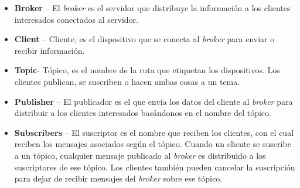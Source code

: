 \begin{itemize}
    \item \textbf{Broker} – El \textit{broker} es el servidor que distribuye la información a los clientes interesados conectados al servidor.
    \item \textbf{Client} – Cliente, es el dispositivo que se conecta al \textit{broker} para enviar o recibir información.
    \item \textbf{Topic}- T\'opico, es el nombre de la ruta que etiquetan los dispositivos. Los clientes publican, se suscriben o hacen ambas cosas a un tema.
    \item \textbf{Publisher} – El publicador es el que envía los datos del cliente  al \textit{broker} para distribuir a los clientes interesados bas\'andonos en el nombre del t\'opico.
    \item \textbf{Subscribers} – El suscriptor es el nombre que reciben los  clientes, con el cual reciben los mensajes asociados según el t\'opico. Cuando un cliente se suscribe a un t\'opico, cualquier mensaje publicado al \textit{broker} es distribuido a los suscriptores de ese t\'opico. Los clientes también pueden cancelar la suscripción para dejar de recibir mensajes del \textit{broker} sobre ese tópico.
\end{itemize}


